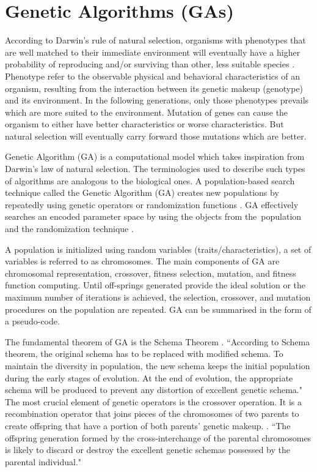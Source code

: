 \section{Genetic Algorithms (GAs)}
According to Darwin's rule of natural selection, organisms with phenotypes that are well matched to their immediate environment will eventually have a higher probability of reproducing and/or surviving than other, less suitable species \citep{DODSON1976243}. Phenotype refer to the observable physical and behavioral characteristics of an organism, resulting from the interaction between its genetic makeup (genotype) and its environment. In the following generations, only those phenotypes prevails which are more suited to the environment. Mutation of genes can cause the organism to either have better characteristics or worse characteristics. But natural selection will eventually carry forward those mutations which are better.\par
Genetic Algorithm (GA) is a computational model which takes inspiration from Darwin's law of natural selection. The terminologies used to describe such types of algorithms are analogous to the biological ones. A population-based search technique called the Genetic Algorithm (GA) creates new populations by repeatedly using genetic operators or randomization functions \citep{Katoch2021}. GA effectively searches an encoded parameter space by using the objects from the population and the randomization technique \citep{Liu2019}.

A population is initialized using random variables (traits/characteristics), a set of variables is referred to as chromosomes. The main components of GA are chromosomal representation, crossover, fitness selection,  mutation, and fitness function computing. Until off-springs generated provide the ideal solution or the maximum number of iterations is achieved, the selection, crossover, and mutation procedures on the population are repeated. GA can be summarised in the form of a pseudo-code. \par



The fundamental theorem of GA is the Schema Theorem \citep{Liu2019}. ``According to Schema theorem, the original schema has to be replaced with modified schema. To maintain the diversity in population, the new schema keeps the initial population during the early stages of evolution. At the end of evolution, the appropriate schema will be produced to prevent any distortion of excellent genetic schema." \citep{Katoch2021} The most crucial element of genetic operators is the crossover operation. It is a recombination operator that joins pieces of the chromosomes of two parents to create offspring that have a portion of both parents' genetic makeup. \citep{Tang1996}. ``The offspring generation formed by the cross-interchange of the parental chromosomes is likely to discard or destroy the excellent genetic schemas possessed by the parental individual."\citep{Liu2019} \par

